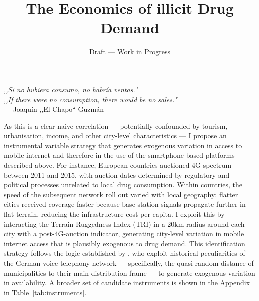 \documentclass[12pt, a4paper]{article}
\title{The Economics of illicit Drug Demand}
\author{Draft --- Work in Progress}
\date{}
\begin{document}
\maketitle

\vspace{1cm} %

\begin{center}
    \textit{,,Si no hubiera consumo, no habría ventas."} \\
    \vspace{0.2cm} %
    \textit{,,If there were no consumption, there would be no sales."} \\
    \vspace{0.5cm}
    --- Joaquín ,,El Chapo`` Guzmán
\end{center}

\newpage %

\noindent As this is a clear naive correlation --- potentially confounded by tourism, urbanisation, income, and other city-level characteristics --- I propose an instrumental variable strategy that generates exogenous variation in access to mobile internet and therefore in the use of the smartphone-based platforms described above. For instance, European countries auctioned 4G spectrum between 2011 and 2015, with auction dates determined by regulatory and political processes unrelated to local drug consumption. Within countries, the speed of the subsequent network roll out varied with local geography: flatter cities received coverage faster because base station signals propagate further in flat terrain, reducing the infrastructure cost per capita. I exploit this by interacting the Terrain Ruggedness Index (TRI) in a 20km radius around each city with a post-4G-auction indicator, generating city-level variation in mobile internet access that is plausibly exogenous to drug demand. This identification strategy follows the logic established by \citet{falck_2014}, who exploit historical peculiarities of the German voice telephony network --- specifically, the quasi-random distance of municipalities to their main distribution frame --- to generate exogenous variation in availability. A broader set of candidate instruments is shown in the Appendix in Table~\ref{tab:instruments}. 
\end{document}
